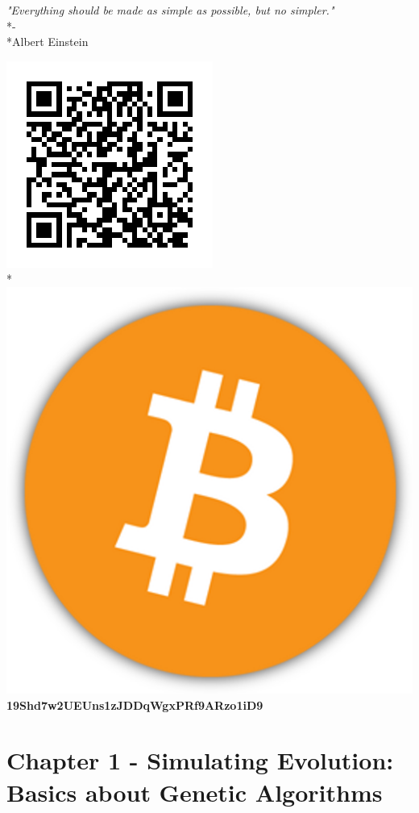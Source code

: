 \documentclass[12pt]{article}
\begin{document}
\begin{center}
\textit{"Everything should be made as simple as possible, but no simpler."}\\*-\\*Albert Einstein
\end{center}
\begin{center}
\includegraphics[scale=0.5]{BitcoinAddress.png}\\*
\includegraphics[scale=0.02]{Bitcoin.png} \textbf{19Shd7w2UEUns1zJDDqWgxPRf9ARzo1iD9}
\end{center}
\clearpage
\section{Chapter 1 - Simulating Evolution: Basics about Genetic Algorithms}
\end{document}
